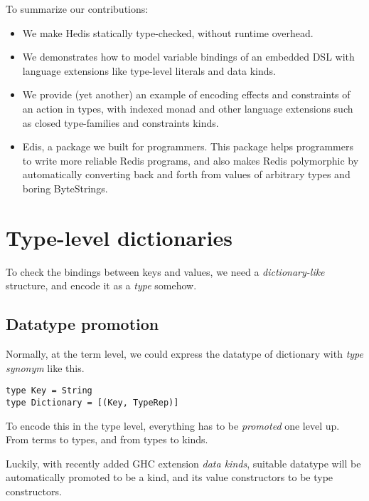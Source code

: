 \documentclass[pldi]{sigplanconf-pldi16}
\begin{document}
To summarize our contributions:

\begin{itemize}[noitemsep]
\item We make Hedis statically type-checked, without runtime overhead.
\item We demonstrates how to model variable bindings of an embedded DSL with
 language extensions like type-level literals and data kinds.
\item We provide (yet another) an example of encoding effects and constraints of
 an action in types, with indexed monad\cite{indexedmonad} and other language
 extensions such as closed type-families\cite{closedtypefamilies} and
 constraints kinds\cite{constraintskinds}.
\item Edis, a package we built for programmers. This package helps programmers
 to write more reliable Redis programs, and also makes Redis polymorphic by
 automatically converting back and forth from values of arbitrary types and
 boring ByteStrings.
\end{itemize}

\section{Type-level dictionaries}

To check the bindings between keys and values, we need a \emph{dictionary-like}
 structure, and encode it as a \emph{type} somehow.

\subsection{Datatype promotion}
Normally, at the term level, we could express the datatype of dictionary with
\emph{type synonym} like this.\footnotemark

\begin{verbatim}
type Key = String
type Dictionary = [(Key, TypeRep)]
\end{verbatim}


To encode this in the type level, everything has to be
 \emph{promoted}\cite{promotion} one level up.
 From terms to types, and from types to kinds.

Luckily, with recently added GHC extension \emph{data kinds}, suitable
 datatype will be automatically promoted to be a kind, and its value
 constructors to be type constructors.
\end{document}
